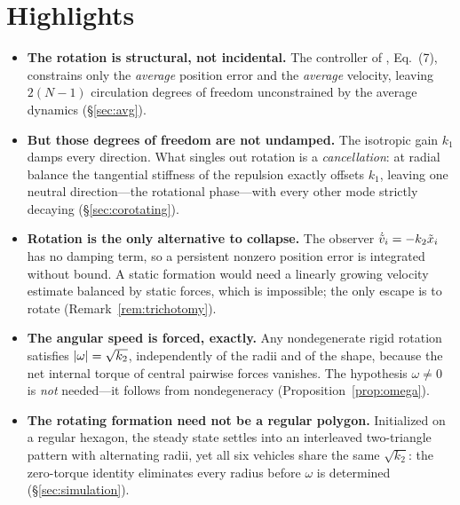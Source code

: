 \section*{Highlights}
\label{sec:highlights}

\begin{itemize}[leftmargin=1.6em,itemsep=0.35em]
  \item \textbf{The rotation is structural, not incidental.} The controller of
        \cite{kou2022cooperative}, Eq.~(7), constrains only the \emph{average} position error and the
        \emph{average} velocity, leaving $2(N-1)$ circulation degrees of freedom unconstrained by the
        average dynamics (\S\ref{sec:avg}).

  \item \textbf{But those degrees of freedom are not undamped.} The isotropic gain $k_1$ damps every
        direction. What singles out rotation is a \emph{cancellation}: at radial balance the tangential
        stiffness of the repulsion exactly offsets $k_1$, leaving one neutral direction---the rotational
        phase---with every other mode strictly decaying (\S\ref{sec:corotating}).

  \item \textbf{Rotation is the only alternative to collapse.} The observer
        $\dot{\tilde{v}}_i=-k_2\tilde{x}_i$ has no damping term, so a persistent nonzero position error is
        integrated without bound. A static formation would need a linearly growing velocity estimate
        balanced by static forces, which is impossible; the only escape is to rotate
        (Remark~\ref{rem:trichotomy}).

  \item \textbf{The angular speed is forced, exactly.} Any nondegenerate rigid rotation satisfies
        $\left| \omega \right|=\sqrt{k_2}$, independently of the radii and of the shape, because the net internal
        torque of central pairwise forces vanishes. The hypothesis $\omega\ne0$ is \emph{not} needed---it
        follows from nondegeneracy (Proposition~\ref{prop:omega}).

  \item \textbf{The rotating formation need not be a regular polygon.} Initialized on a regular hexagon,
        the steady state settles into an interleaved two-triangle pattern with alternating radii, yet all
        six vehicles share the same $\sqrt{k_2}$: the zero-torque identity eliminates every radius before
        $\omega$ is determined (\S\ref{sec:simulation}).


\end{itemize}
